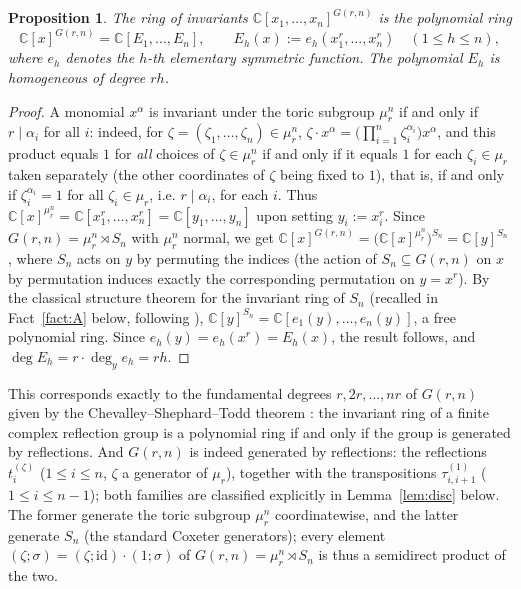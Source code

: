 \documentclass[10pt,a4paper]{amsart}
\newtheorem{proposition}[theorem]{Proposition}
\newcommand{\CC}{\mathbb{C}}
\begin{document}
\begin{proposition}\label{prop:invariants}
The ring of invariants $\CC[x_1,\dots,x_n]^{G(r,n)}$ is the polynomial ring
\[
\CC[x]^{G(r,n)} = \CC[E_1,\dots,E_n], \qquad E_h(x) := e_h(x_1^r,\dots,x_n^r) \quad (1\le h\le n),
\]
where $e_h$ denotes the $h$-th elementary symmetric function. The polynomial $E_h$ is homogeneous of degree $rh$.
\end{proposition}

\begin{proof}
A monomial $x^\alpha$ is invariant under the toric subgroup $\mu_r^n$ if and only if $r\mid \alpha_i$ for all $i$: indeed, for $\zeta=(\zeta_1,\dots,\zeta_n)\in\mu_r^n$, $\zeta\cdot x^\alpha = \big(\prod_{i=1}^n\zeta_i^{\alpha_i}\big)x^\alpha$, and this product equals $1$ for \emph{all} choices of $\zeta\in\mu_r^n$ if and only if it equals $1$ for each $\zeta_i\in\mu_r$ taken separately (the other coordinates of $\zeta$ being fixed to $1$), that is, if and only if $\zeta_i^{\alpha_i}=1$ for all $\zeta_i\in\mu_r$, i.e. $r\mid\alpha_i$, for each $i$. Thus $\CC[x]^{\mu_r^n}=\CC[x_1^r,\dots,x_n^r]=\CC[y_1,\dots,y_n]$ upon setting $y_i:=x_i^r$. Since $G(r,n)=\mu_r^n\rtimes S_n$ with $\mu_r^n$ normal, we get $\CC[x]^{G(r,n)}=\big(\CC[x]^{\mu_r^n}\big)^{S_n}=\CC[y]^{S_n}$, where $S_n$ acts on $y$ by permuting the indices (the action of $S_n\subseteq G(r,n)$ on $x$ by permutation induces exactly the corresponding permutation on $y=x^r$). By the classical structure theorem for the invariant ring of $S_n$ \cite[Ch.~I]{Mac} (recalled in Fact~\ref{fact:A} below, following \cite{Ze}), $\CC[y]^{S_n}=\CC[e_1(y),\dots,e_n(y)]$, a free polynomial ring. Since $e_h(y)=e_h(x^r)=E_h(x)$, the result follows, and $\deg E_h = r\cdot\deg_y e_h = rh$.
\end{proof}

This corresponds exactly to the fundamental degrees $r,2r,\dots,nr$ of $G(r,n)$ given by the Chevalley--Shephard--Todd theorem \cite{ST,Ch}: the invariant ring of a finite complex reflection group is a polynomial ring if and only if the group is generated by reflections. And $G(r,n)$ is indeed generated by reflections: the reflections $t_i^{(\zeta)}$ ($1\le i\le n$, $\zeta$ a generator of $\mu_r$), together with the transpositions $\tau_{i,i+1}^{(1)}$ ($1\le i\le n-1$); both families are classified explicitly in Lemma~\ref{lem:disc} below. The former generate the toric subgroup $\mu_r^n$ coordinatewise, and the latter generate $S_n$ (the standard Coxeter generators); every element $(\zeta;\sigma)=(\zeta;\mathrm{id})\cdot(1;\sigma)$ of $G(r,n)=\mu_r^n\rtimes S_n$ is thus a semidirect product of the two.
\end{document}
